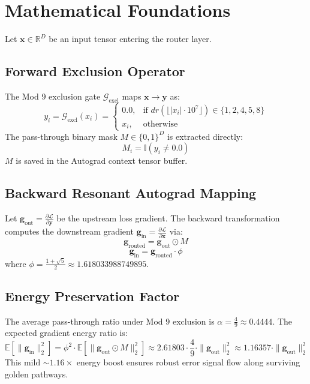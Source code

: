\section{Mathematical Foundations}

Let $\mathbf{x} \in \mathbb{R}^D$ be an input tensor entering the router layer.

\subsection{Forward Exclusion Operator}
The Mod 9 exclusion gate $\mathcal{G}_{\text{excl}}$ maps $\mathbf{x} \to \mathbf{y}$ as:
\begin{equation}
y_i = \mathcal{G}_{\text{excl}}(x_i) = \begin{cases}
0.0, & \text{if } dr(\lfloor |x_i| \cdot 10^7 \rfloor) \in \{1, 2, 4, 5, 8\} \\
x_i, & \text{otherwise}
\end{cases}
\end{equation}
The pass-through binary mask $M \in \{0, 1\}^D$ is extracted directly:
\begin{equation}
M_i = \mathbb{I}(y_i \neq 0.0)
\end{equation}
$M$ is saved in the Autograd context tensor buffer.

\subsection{Backward Resonant Autograd Mapping}
Let $\mathbf{g}_{\text{out}} = \frac{\partial \mathcal{L}}{\partial \mathbf{y}}$ be the upstream loss gradient. The backward transformation computes the downstream gradient $\mathbf{g}_{\text{in}} = \frac{\partial \mathcal{L}}{\partial \mathbf{x}}$ via:
\begin{equation}
\mathbf{g}_{\text{routed}} = \mathbf{g}_{\text{out}} \odot M
\end{equation}
\begin{equation}
\mathbf{g}_{\text{in}} = \mathbf{g}_{\text{routed}} \cdot \phi
\end{equation}
where $\phi = \frac{1+\sqrt{5}}{2} \approx 1.618033988749895$.

\subsection{Energy Preservation Factor}
The average pass-through ratio under Mod 9 exclusion is $\alpha = \frac{4}{9} \approx 0.4444$. The expected gradient energy ratio is:
\begin{equation}
\mathbb{E}[\|\mathbf{g}_{\text{in}}\|_2^2] = \phi^2 \cdot \mathbb{E}[\|\mathbf{g}_{\text{out}} \odot M\|_2^2] \approx 2.61803 \cdot \frac{4}{9} \cdot \|\mathbf{g}_{\text{out}}\|_2^2 \approx 1.16357 \cdot \|\mathbf{g}_{\text{out}}\|_2^2
\end{equation}
This mild $\sim 1.16\times$ energy boost ensures robust error signal flow along surviving golden pathways.
